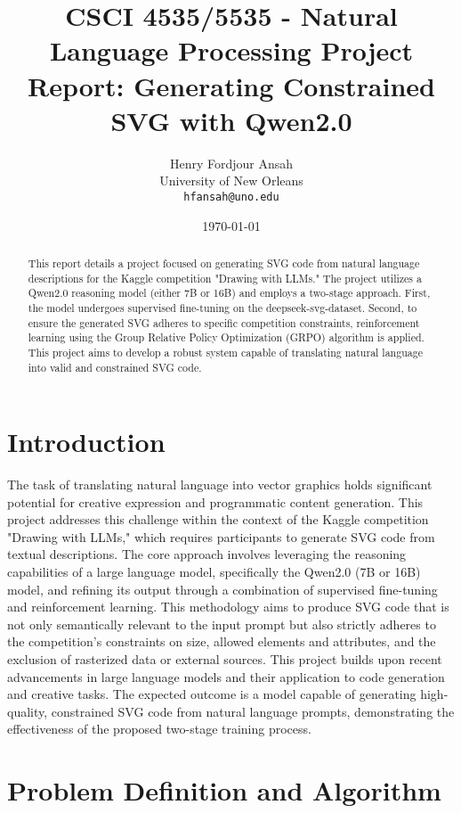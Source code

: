 \documentclass[11pt]{article}
\title{CSCI 4535/5535 - Natural Language Processing Project Report: Generating Constrained SVG with Qwen2.0}
\author{Henry Fordjour Ansah\\
        University of New Orleans\\
        \texttt{hfansah@uno.edu}}
\date{\today}
\begin{document}
\maketitle

\begin{abstract}
This report details a project focused on generating SVG code from natural language descriptions for the Kaggle competition "Drawing with LLMs." The project utilizes a Qwen2.0 reasoning model (either 7B or 16B) and employs a two-stage approach. First, the model undergoes supervised fine-tuning on the deepseek-svg-dataset. Second, to ensure the generated SVG adheres to specific competition constraints, reinforcement learning using the Group Relative Policy Optimization (GRPO) algorithm is applied. This project aims to develop a robust system capable of translating natural language into valid and constrained SVG code.
\end{abstract}

\section{Introduction}
The task of translating natural language into vector graphics holds significant potential for creative expression and programmatic content generation. This project addresses this challenge within the context of the Kaggle competition "Drawing with LLMs," which requires participants to generate SVG code from textual descriptions. The core approach involves leveraging the reasoning capabilities of a large language model, specifically the Qwen2.0 (7B or 16B) model, and refining its output through a combination of supervised fine-tuning and reinforcement learning. This methodology aims to produce SVG code that is not only semantically relevant to the input prompt but also strictly adheres to the competition's constraints on size, allowed elements and attributes, and the exclusion of rasterized data or external sources. This project builds upon recent advancements in large language models and their application to code generation and creative tasks. The expected outcome is a model capable of generating high-quality, constrained SVG code from natural language prompts, demonstrating the effectiveness of the proposed two-stage training process.

\section{Problem Definition and Algorithm}
\end{document}
